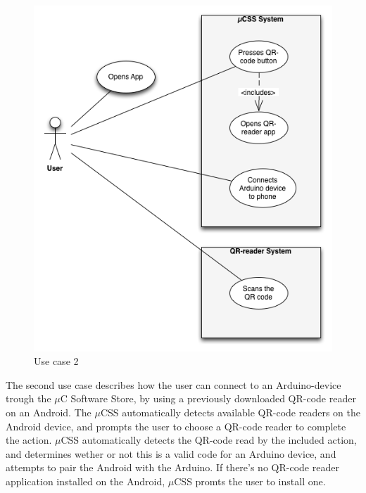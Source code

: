 \begin{figure}[H]
\centering
\includegraphics[scale=0.7]{images/UseCase2}
\caption{Use case 2}
\end{figure}

The second use case describes how the user can connect to an Arduino-device trough the $\mu$C Software Store, by using a previously downloaded QR-code reader on an Android. The $\mu$CSS automatically detects available QR-code readers on the Android device, and prompts the user to choose a QR-code reader to complete the action. $\mu$CSS automatically detects the QR-code read by the included action, and determines wether or not this is a valid code for an Arduino device, and attempts to pair the Android with the Arduino. If there's no QR-code reader application installed on the Android, $\mu$CSS promts the user to install one.

